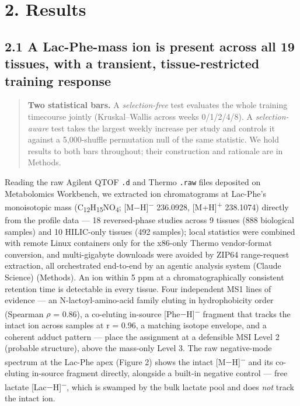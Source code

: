 \documentclass[11pt]{article}
\begin{document}
\section*{2. Results}

\subsection*{2.1 A Lac-Phe-mass ion is present across all 19 tissues, with a transient, tissue-restricted training response}

\begin{quote}\small \textbf{Two statistical bars.} A \textit{selection-free} test evaluates the whole training timecourse jointly (Kruskal--Wallis across weeks 0/1/2/4/8). A \textit{selection-aware} test takes the largest weekly increase per study and controls it against a 5,000-shuffle permutation null of the same statistic. We hold results to both bars throughout; their construction and rationale are in Methods.\end{quote}

Reading the raw Agilent QTOF \texttt{.d} and Thermo \texttt{.raw} files deposited on Metabolomics
Workbench, we extracted ion chromatograms at Lac-Phe's monoisotopic mass (C\textsubscript{1}\textsubscript{2}H\textsubscript{1}\textsubscript{5}NO\textsubscript{4};
[M$-$H]\textsuperscript{$-$} 236.0928, [M+H]\textsuperscript{+} 238.1074) directly from the profile data --- 18 reversed-phase
studies across 9 tissues (888 biological samples) and 10 HILIC-only tissues (492
samples); local statistics were combined with remote Linux containers only for the
x86-only Thermo vendor-format conversion, and multi-gigabyte downloads were avoided by
ZIP64 range-request extraction, all orchestrated end-to-end by an agentic analysis system
(Claude Science) (Methods). An ion within 5 ppm at a chromatographically consistent retention time is
detectable in every tissue. Four independent MS1 lines of evidence --- an
N-lactoyl-amino-acid family eluting in hydrophobicity order (Spearman $\rho$ = 0.86), a co-eluting
in-source [Phe$-$H]\textsuperscript{$-$} fragment that tracks the intact ion across samples at r = 0.96, a
matching isotope envelope, and a coherent adduct pattern --- place the assignment at a
defensible MSI Level 2 (probable structure), above the mass-only Level 3. The raw
negative-mode spectrum at the Lac-Phe apex (Figure 2) shows the intact [M$-$H]\textsuperscript{$-$}
and its co-eluting in-source fragment directly, alongside a built-in negative control ---
free lactate [Lac$-$H]\textsuperscript{$-$}, which is swamped by the bulk lactate pool and does
\textit{not} track the intact ion.
\end{document}
